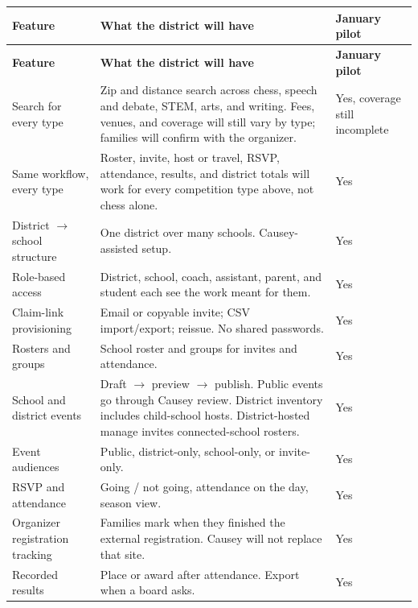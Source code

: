 \documentclass[11pt]{article}
\begin{document}
\begin{longtable}{@{}L{0.28\textwidth} L{0.44\textwidth} L{0.22\textwidth}@{}}
  \toprule
  \textbf{Feature} & \textbf{What the district will have} & \textbf{January pilot} \\
  \midrule
  \endfirsthead
  \toprule
  \textbf{Feature} & \textbf{What the district will have} & \textbf{January pilot} \\
  \midrule
  \endhead
  \bottomrule
  \endfoot

  Search for every type
    & Zip and distance search across chess, speech and debate, STEM, arts, and writing. Fees, venues, and coverage will still vary by type; families will confirm with the organizer.
    & Yes, coverage still incomplete \\
  \addlinespace
  Same workflow, every type
    & Roster, invite, host or travel, RSVP, attendance, results, and district totals will work for every competition type above, not chess alone.
    & Yes \\
  \addlinespace
  District $\to$ school structure
    & One district over many schools. Causey-assisted setup.
    & Yes \\
  \addlinespace
  Role-based access
    & District, school, coach, assistant, parent, and student each see the work meant for them.
    & Yes \\
  \addlinespace
  Claim-link provisioning
    & Email or copyable invite; CSV import/export; reissue. No shared passwords.
    & Yes \\
  \addlinespace
  Rosters and groups
    & School roster and groups for invites and attendance.
    & Yes \\
  \addlinespace
  School and district events
    & Draft $\to$ preview $\to$ publish. Public events go through Causey review. District inventory includes child-school hosts. District-hosted manage invites connected-school rosters.
    & Yes \\
  \addlinespace
  Event audiences
    & Public, district-only, school-only, or invite-only.
    & Yes \\
  \addlinespace
  RSVP and attendance
    & Going / not going, attendance on the day, season view.
    & Yes \\
  \addlinespace
  Organizer registration tracking
    & Families mark when they finished the external registration. Causey will not replace that site.
    & Yes \\
  \addlinespace
  Recorded results
    & Place or award after attendance. Export when a board asks.
    & Yes \\

\end{longtable}
\end{document}
